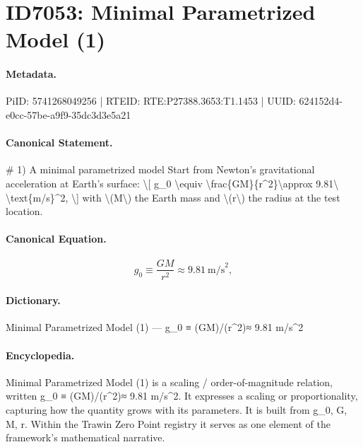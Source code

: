 \section*{ID7053: Minimal Parametrized Model (1)}
\paragraph{Metadata.}
PiID: 5741268049256 | RTEID: RTE:P27388.3653:T1.1453 | UUID: 624152d4-e0cc-57be-a9f9-35dc3d3e5a21

\paragraph{Canonical Statement.}
\# 1) A minimal parametrized model Start from Newton’s gravitational acceleration at Earth’s surface: \textbackslash{}[ g\_0 \textbackslash{}equiv \textbackslash{}frac\{GM\}\{r\textasciicircum{}2\}\textbackslash{}approx 9.81\textbackslash{} \textbackslash{}text\{m/s\}\textasciicircum{}2, \textbackslash{}] with \textbackslash{}(M\textbackslash{}) the Earth mass and \textbackslash{}(r\textbackslash{}) the radius at the test location.

\paragraph{Canonical Equation.}
\[
g_0 \equiv \frac{GM}{r^2}\approx 9.81\ \text{m/s}^2,
\]

\paragraph{Dictionary.}
Minimal Parametrized Model (1) — g\_0 ≡ (GM)/(r\textasciicircum{}2)≈ 9.81 m/s\textasciicircum{}2

\paragraph{Encyclopedia.}
Minimal Parametrized Model (1) is a scaling / order-of-magnitude relation, written g\_0 ≡ (GM)/(r\textasciicircum{}2)≈ 9.81 m/s\textasciicircum{}2. It expresses a scaling or proportionality, capturing how the quantity grows with its parameters. It is built from g\_0, G, M, r. Within the Trawin Zero Point registry it serves as one element of the framework's mathematical narrative.
